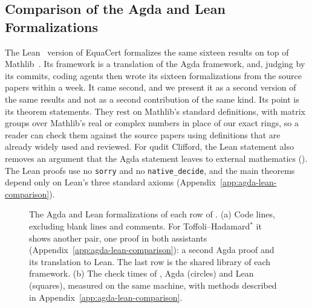 \documentclass[acmsmall,screen,nonacm]{acmart}
\begin{document}

\iffalse
\subsection{Comparison of the Agda and Lean Formalizations}
\label{sec:compare}

The Lean~\cite{moura2021lean4} version of EquaCert formalizes the same sixteen results on top of Mathlib~\cite{mathlib2020}. Its framework is a translation of the Agda framework, and, judging by its commits, coding agents then wrote its sixteen formalizations from the source papers within a week. It came second, and we present it as a second version of the same results and not as a second contribution of the same kind. Its point is its theorem statements. They rest on Mathlib's standard definitions, with matrix groups over Mathlib's real or complex numbers in place of our exact rings, so a reader can check them against the source papers using definitions that are already widely used and reviewed. For qudit Clifford, the Lean statement also removes an argument that the Agda statement leaves to external mathematics (). The Lean proofs use no \texttt{sorry} and no \texttt{native\_decide}, and the main theorems depend only on Lean's three standard axioms (Appendix~\ref{app:agda-lean-comparison}).

\begin{figure}[!htbp]
\centering
\begingroup
{}

\endgroup
\caption{The Agda and Lean formalizations of each row of . (a) Code lines, excluding blank lines and comments. For Toffoli--Hadamard$^{\ast}$ it shows another pair, one proof in both assistants (Appendix~\ref{app:agda-lean-comparison}): a second Agda proof and its translation to Lean. The last row is the shared library of each framework. (b) The check times of , Agda (circles) and Lean (squares), measured on the same machine, with methods described in Appendix~\ref{app:agda-lean-comparison}.}
\label{fig:compare}
\end{figure}
\end{document}
